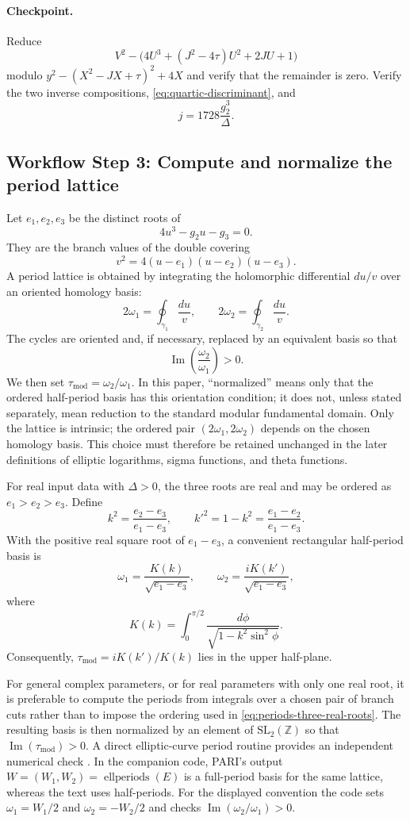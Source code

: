\documentclass[11pt]{article}
\newcommand{\workflowstep}[1]{\subsection{Workflow Step #1}}
\newcommand{\taupar}{\tau}
\newcommand{\taumod}{\tau_{\mathrm{mod}}}
\begin{document}
\paragraph{Checkpoint.}
Reduce
\[
  V^2-\bigl(4U^3+(J^2-4\taupar)U^2+2JU+1\bigr)
\]
modulo $y^2-(X^2-JX+\taupar)^2+4X$ and verify that the remainder is zero.
Verify the two inverse compositions, \cref{eq:quartic-discriminant}, and
\[
  j=1728\frac{g_2^3}{\Delta}.
\]

\workflowstep{3: Compute and normalize the period lattice}
Let $e_1,e_2,e_3$ be the distinct roots of
\[
  4u^3-g_2u-g_3=0.
\]
They are the branch values of the double covering
\[
  v^2=4(u-e_1)(u-e_2)(u-e_3).
\]
A period lattice is obtained by integrating the holomorphic differential
$du/v$ over an oriented homology basis:
\[
  2\omega_1=\oint_{\gamma_1}\frac{du}{v},
  \qquad
  2\omega_2=\oint_{\gamma_2}\frac{du}{v}.
\]
The cycles are oriented and, if necessary, replaced by an equivalent basis so
that
\[
  \operatorname{Im}\left(\frac{\omega_2}{\omega_1}\right)>0.
\]
We then set $\taumod=\omega_2/\omega_1$. In this paper, ``normalized'' means
only that the ordered half-period basis has this orientation condition; it
does not, unless stated separately, mean reduction to the standard modular
fundamental domain. Only the lattice is intrinsic; the ordered pair
$(2\omega_1,2\omega_2)$ depends on the chosen homology basis. This choice must
therefore be retained unchanged in the later definitions of elliptic
logarithms, sigma functions, and theta functions.

For real input data with $\Delta>0$, the three roots are real and may be
ordered as $e_1>e_2>e_3$. Define
\[
  k^2=\frac{e_2-e_3}{e_1-e_3},
  \qquad
  k'^2=1-k^2=\frac{e_1-e_2}{e_1-e_3}.
\]
With the positive real square root of $e_1-e_3$, a convenient rectangular
half-period basis is
\begin{equation}
  \omega_1=\frac{K(k)}{\sqrt{e_1-e_3}},
  \qquad
  \omega_2=\frac{iK(k')}{\sqrt{e_1-e_3}},
  \label{eq:periods-three-real-roots}
\end{equation}
where
\[
  K(k)=\int_0^{\pi/2}\frac{d\phi}{\sqrt{1-k^2\sin^2\phi}}.
\]
Consequently, $\taumod=iK(k')/K(k)$ lies in the upper half-plane.

For general complex parameters, or for real parameters with only one real
root, it is preferable to compute the periods from integrals over a chosen
pair of branch cuts rather than to impose the ordering used in
\cref{eq:periods-three-real-roots}. The resulting basis is then normalized by
an element of $\mathrm{SL}_2(\mathbb Z)$ so that
$\operatorname{Im}(\taumod)>0$. A direct elliptic-curve period routine provides an independent numerical check
\cite{PARIGPManual,DLMF23}. In the companion code, PARI's output
$W=(W_1,W_2)=\operatorname{ellperiods}(E)$ is a full-period basis for the same
lattice, whereas the text uses half-periods. For the displayed convention the
code sets $\omega_1=W_1/2$ and $\omega_2=-W_2/2$ and checks
$\operatorname{Im}(\omega_2/\omega_1)>0$.
\end{document}
